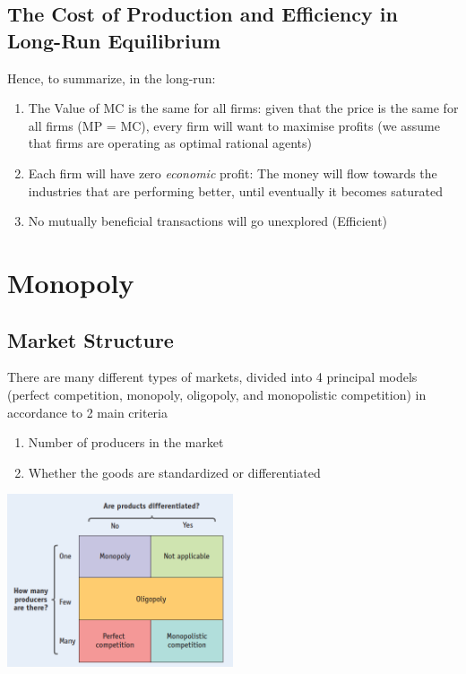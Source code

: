 \documentclass[english,course]{Notes}
\newcommand{\ita}[1]{\textit{#1}}
\begin{document}
\subsection{The Cost of Production and Efficiency in Long-Run Equilibrium}

\par{Hence, to summarize, in the long-run:}

\begin{enumerate}
	\item The Value of MC is the same for all firms: given that the price is the same for all firms (MP = MC), every firm will want to maximise profits (we assume that firms are operating as optimal rational agents)
	\item Each firm will have zero \ita{economic} profit: The money will flow towards the industries that are performing better, until eventually it becomes saturated
	\item No mutually beneficial transactions will go unexplored (Efficient)
\end{enumerate}

\section{Monopoly}

\subsection{Market Structure}

\par{There are many different types of markets, divided into 4 principal models (perfect competition, monopoly, oligopoly, and monopolistic competition) in accordance to 2 main criteria }

\begin{enumerate}
	\item Number of producers in the market
	\item Whether the goods are standardized or differentiated 
\end{enumerate}

\includegraphics[width=0.5\textwidth]{marketStrut}
\end{document}
